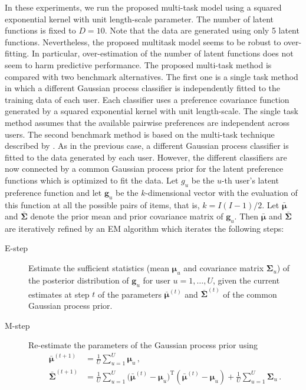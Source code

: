 In these experiments, we run the proposed multi-task model using a squared exponential kernel with unit length-scale parameter.
The number of latent functions is fixed to $D = 10$. Note that the data are generated using only 5 latent functions.
Nevertheless, the proposed multitask model seems to be robust to over-fitting. In particular, over-estimation of the number of latent functions
does not seem to harm predictive performance. The proposed multi-task method is compared with two benchmark alternatives.
The first one is a single task method in which a different Gaussian process classifier is independently fitted to the training data of each user. 
Each classifier uses a preference covariance function generated by a squared exponential kernel with unit length-scale.
The single task method assumes that the available pairwise preferences are independent across users. 
The second benchmark method is based on the multi-task technique described by \cite{Birlutiu2011}. 
As in the previous case, a different Gaussian process classifier is
fitted to the data generated by each user. However, the different classifiers are now connected by a
common Gaussian process prior for the latent preference functions which is optimized to fit the data.
Let $g_u$ be the $u$-th user's latent preference function and let 
$\bm g_u$ be the $k$-dimensional vector with the evaluation of this function at all the possible pairs of items, that is, $k = I(I-1)/2$.
Let $\bar{\bm \mu}$ and $\bar{\bm \Sigma}$ denote the prior mean and prior covariance matrix of $\bm g_u$.
Then $\bar{\bm \mu}$ and $\bar{\bm \Sigma}$ are iteratively refined by an EM algorithm which iterates the following steps:
\begin{description}
\item[E-step] Estimate the sufficient statistics (mean $\bm \mu_u$ and covariance matrix $\bm \Sigma_u$) of the posterior distribution of $\bm g_u$
for user $u=1,\ldots,U$, given the current estimates at step $t$ of the parameters $\bar{\bm \mu}^{(t)}$ and $\bar{\bm \Sigma}^{(t)}$ of the
common Gaussian process prior.

\item[M-step] Re-estimate the parameters of the Gaussian process prior using
\begin{align}
\bar{\bm \mu}^{(t+1)} & = \frac{1}{U} \sum_{u=1}^U \bm \mu_u\,,\\
\bar{\bm \Sigma}^{(t+1)} & = \frac{1}{U} \sum_{u=1}^U \bm (\bar{\bm \mu}^{(t)} - \bm \mu_u)^\text{T} (\bar{\bm \mu}^{(t)} - \bm \mu_u) + 
\frac{1}{U}\sum_{u=1}^U \bm \Sigma_u \,.
\end{align}
\end{description}
